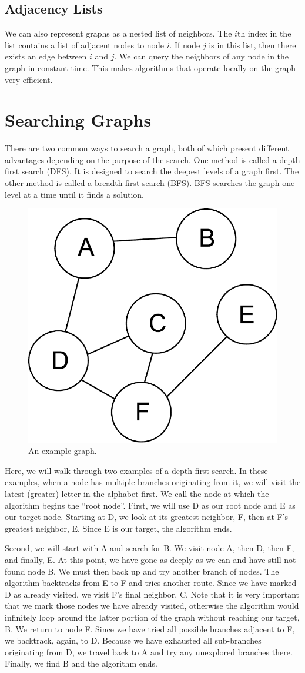 \subsection*{Adjacency Lists}
We can also represent graphs as a nested list of neighbors.
The $i$th index in the list contains a list of adjacent nodes to node $i$.
If node $j$ is in this list, then there exists an edge between $i$ and $j$.
We can query the neighbors of any node in the graph in constant time.
This makes algorithms that operate locally on the graph very efficient.

\section*{Searching Graphs}
There are two common ways to search a graph, both of which present different advantages depending on the purpose of the search.
One method is called a depth first search (DFS).  It is designed to search the deepest levels of a graph first.
The other method is called a breadth first search (BFS).  BFS searches the graph one level at a time until it finds a solution.
\begin{figure}[h]
\centering
\includegraphics[width=.5\textwidth]{graph.pdf}
\caption{An example graph.}
\label{fig:bfs_dfs_graph}
\end{figure}


Here, we will walk through two examples of a depth first search.
In these examples, when a node has multiple branches originating from it,
we will visit the latest (greater) letter in the alphabet first.
We call the node at which the algorithm begins the ``root node''.
First, we will use D as our root node and E as our target node.
Starting at D, we look at its greatest neighbor, F, then at F's greatest
neighbor, E. Since E is our target, the algorithm ends.

Second, we will start with A and search for B.
We visit node A, then D, then F, and finally, E.
At this point, we have gone as deeply as we can and have still not found node B.
We must then back up and try another branch of nodes.
The algorithm backtracks from E to F and tries another route.
Since we have marked D as already visited, we visit F's final neighbor, C.
Note that it is very important that we mark those nodes we have already visited,
otherwise the algorithm would infinitely loop around the latter portion of
the graph without reaching our target, B. We return to node F. Since we have
tried all possible branches adjacent to F, we backtrack, again, to D. Because we have
exhausted all sub-branches originating from D, we travel back to A and try
any unexplored branches there. Finally, we find B and the algorithm ends.

